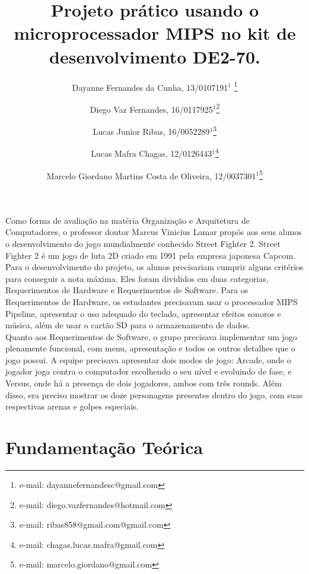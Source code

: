 \documentclass{vgtc}                          %
\title{Projeto prático usando o microprocessador MIPS no kit de desenvolvimento DE2-70.}
\author{Dayanne Fernandes da Cunha, 13/0107191$^{1}$ \thanks{e-mail: dayannefernandesc@gmail.com}%
\and Diego Vaz Fernandes, 16/0117925$^{1}$\thanks{e-mail: diego.vazfernandes@hotmail.com}%
\and Lucas Junior Ribas, 16/0052289$^{1}$\thanks{e-mail: ribas858@gmail.com@gmail.com}
\and Lucas Mafra Chagas, 12/0126443$^{1}$\thanks{e-mail: chagas.lucas.mafra@gmail.com}
\and Marcelo Giordano Martins Costa de Oliveira, 12/0037301$^{1}$\thanks{e-mail: marcelo.giordano@gmail.com}}
\affiliation{\scriptsize $^{1}$Universidade de Brasília, Departamento de Ciência da Computação, Brasil}
\begin{document}







\maketitle


Como forma de avaliação na matéria Organização e Arquitetura de Computadores, o professor doutor Marcus Vinicius Lamar propós aos seus alunos o desenvolvimento do jogo mundialmente conhecido Street Fighter 2. Street Fighter 2 é um jogo de luta 2D criado em 1991 pela empresa japonesa Capcom.\\ 

Para o desenvolvimento do projeto, os alunos precisariam cumprir alguns critérios para conseguir a nota máxima. Eles foram divididos em duas categorias, Requerimentos de Hardware e Requerimentos de Software. Para os Requerimentos de Hardware, os estudantes precisavam usar o processador MIPS Pipeline, apresentar o uso adequado do teclado, apresentar efeitos sonoros e música, além de usar o cartão SD para o armazenamento de dados. \\

Quanto aos Requerimentos de Software, o grupo precisava implementar um jogo plenamente funcional, com menu, apresentação e todos os outros detalhes que o jogo possui. A equipe precisava apresentar dois modos de jogo: Arcade, onde o jogador joga contra o computador escolhendo o seu nível e evoluindo de fase, e Versus, onde há a presença de dois jogadores, ambos com três rounds. Além disso, era preciso mostrar os doze personagens presentes dentro do jogo, com suas respectivas arenas e golpes especiais. 


\section{Fundamentação Teórica}
\end{document}
